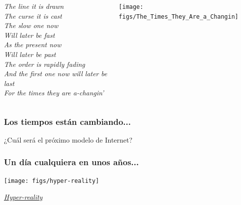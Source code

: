 \documentclass[17pt,aspectratio=169]{beamer}
\begin{document}
\begin{frame}[fragile]

\begin{columns}
  \begin{column}{0.7\textwidth}
    {\em \small
    The line it is drawn \\
    The curse it is cast \\
    The slow one now \\
    Will later be fast \\
    As the present now \\
    Will later be past \\
    The order is rapidly fading \\
    And the first one now will later be last \\
    For the times they are a-changin' \\
    }
  \end{column}
  \begin{column}{0.3\textwidth}  %
    \begin{center}
      \texttt{[image: figs/The\_Times\_They\_Are\_a\_Changin]}
    \end{center}
  \end{column}
\end{columns}
  
\end{frame}


\begin{frame}[fragile]
  \frametitle{Los tiempos están cambiando...}


  ¿Cuál será el próximo modelo de Internet?
  
\end{frame}

\begin{frame}[fragile]
\frametitle{Un día cualquiera en unos años...}

  \begin{center}
  \texttt{[image: figs/hyper-reality]}
  \end{center}

  \begin{flushright}
    {\em \tiny
      \href{https://www.youtube.com/watch?v=YJg02ivYzSs}{Hyper-reality}}
  \end{flushright}
  
\end{frame}
\end{document}
